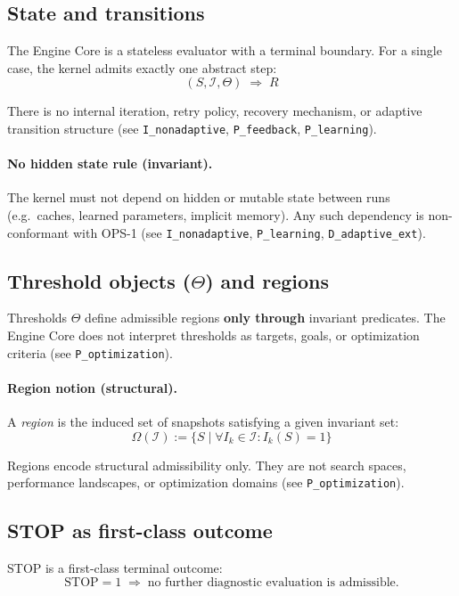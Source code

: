 \subsection{State and transitions}

The Engine Core is a stateless evaluator with a terminal boundary.
For a single case, the kernel admits exactly one abstract step:
\[
(S, \mathcal{I}, \Theta) \;\Rightarrow\; R
\]

There is no internal iteration, retry policy, recovery mechanism, or adaptive
transition structure (see \texttt{I\_nonadaptive}, \texttt{P\_feedback},
\texttt{P\_learning}).

\paragraph{No hidden state rule (invariant).}
The kernel must not depend on hidden or mutable state between runs
(e.g.\ caches, learned parameters, implicit memory).
Any such dependency is non-conformant with OPS-1
(see \texttt{I\_nonadaptive}, \texttt{P\_learning}, \texttt{D\_adaptive\_ext}).

\subsection{Threshold objects (\texorpdfstring{$\Theta$}{Theta}) and regions}

Thresholds $\Theta$ define admissible regions \textbf{only through} invariant
predicates. The Engine Core does not interpret thresholds as targets, goals, or
optimization criteria (see \texttt{P\_optimization}).

\paragraph{Region notion (structural).}
A \emph{region} is the induced set of snapshots satisfying a given invariant set:
\[
\Omega(\mathcal{I}) := \{ S \mid \forall I_k \in \mathcal{I}: I_k(S)=1 \}
\]

Regions encode structural admissibility only.
They are not search spaces, performance landscapes, or optimization domains
(see \texttt{P\_optimization}).

\subsection{STOP as first-class outcome}

STOP is a first-class terminal outcome:
\[
\mathrm{STOP}=1 \;\Rightarrow\; \text{no further diagnostic evaluation is admissible.}
\]

